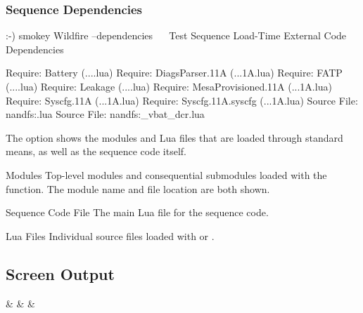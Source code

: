 \subsubsection{Sequence Dependencies}

\begin{LogExcerpt}
:-) smokey Wildfire --dependencies
~\elide~
Test Sequence Load-Time External Code Dependencies

Require: Battery             (...\Wildfire{}\Battery.lua)
Require: DiagsParser.11A     (...\Shared\DiagsParser\11A\init.lua)
Require: FATP                (...\Wildfire{}\FATP.lua)
Require: Leakage             (...\Wildfire{}\Leakage.lua)
Require: MesaProvisioned.11A (...\Shared\MesaProvisioned\11A\init.lua)
Require: Syscfg.11A          (...\Shared\Syscfg\11A\init.lua)
Require: Syscfg.11A.syscfg   (...\Shared\Syscfg\11A\syscfg.lua)
Source File: nandfs:\AppleInternal\Diags\Logs\Smokey\Wildfire{}\Main.lua
Source File: nandfs:\AppleInternal\Diags\Logs\Smokey\measure_vbat_dcr\Main.lua
\end{LogExcerpt}

The  option shows the modules and Lua files that are
loaded through standard means, as well as the sequence code itself.

\begin{Descriptive}

	\item[Modules] Top-level modules and consequential submodules loaded
	with the  function.  The module name and file location
	are both shown.

	\item[Sequence Code File] The main Lua file for the sequence code.

	\item[Lua Files] Individual source files loaded with  or
	.

\end{Descriptive}

\subsection{Screen Output}

\begin{StatusScreenTable}
	 &
	 &
	 &
	 \\
\end{StatusScreenTable}

